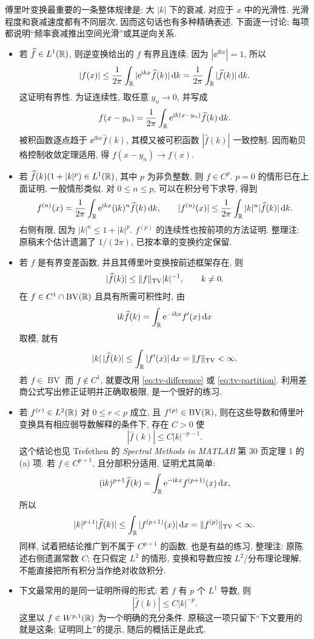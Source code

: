 傅里叶变换最重要的一条整体规律是: 大 $|k|$ 下的衰减, 对应于 $x$ 中的光滑性. 光滑程度和衰减速度都有不同层次, 因而这句话也有多种精确表述. 下面逐一讨论; 每项都说明“频率衰减推出空间光滑”或其逆向关系.
\begin{itemize}
\item 若 $\widehat f\in L^1(\mathbb R)$, 则逆变换给出的 $f$ 有界且连续. 因为 $|\ee^{\ii kx}|=1$, 所以
\[
|f(x)|\le\frac1{2\pi}\int_{\mathbb R}|\mathrm e^{\mathrm i kx}\widehat f(k)|\,\mathrm d k
=\frac1{2\pi}\int_{\mathbb R}|\widehat f(k)|\,\mathrm d k.
\]
这证明有界性. 为证连续性, 取任意 $y_n\to0$, 并写成
\[
f(x-y_n)=\frac1{2\pi}\int_{\mathbb R}\mathrm e^{\mathrm i k(x-y_n)}\widehat f(k)\,\mathrm d k.
\]
被积函数逐点趋于 $\ee^{\ii kx}\widehat f(k)$, 其模又被可积函数 $|\widehat f(k)|$ 一致控制. 因而勒贝格控制收敛定理适用, 得 $f(x-y_n)\to f(x)$.

\item 若 $\widehat f(k)(1+|k|^p)\in L^1(\mathbb R)$, 其中 $p$ 为非负整数, 则 $f\in C^p$. $p=0$ 的情形已在上面证明, 一般情形类似. 对 $0\le n\le p$, 可以在积分号下求导, 得到
\[
f^{(n)}(x)=\frac1{2\pi}\int_{\mathbb R}\mathrm e^{\mathrm i kx}(\mathrm i k)^n\widehat f(k)\,\mathrm d k,
\qquad
|f^{(n)}(x)|\le\frac1{2\pi}\int_{\mathbb R}|k|^n|\widehat f(k)|\,\mathrm d k.
\]
右侧有限, 因为 $|k|^n\le1+|k|^p$. $f^{(p)}$ 的连续性也按前项的方法证明. 整理注: 原稿末个估计遗漏了 $1/(2\pi)$, 已按本章的变换约定保留.

\item 若 $f$ 是有界变差函数, 并且其傅里叶变换按前述框架存在, 则
\[
|\widehat f(k)|\le\lVert f\rVert_{\operatorname{TV}}|k|^{-1},\qquad k\ne0.
\]
在 $f\in C^1\cap\operatorname{BV}(\mathbb R)$ 且具有所需可积性时, 由
\[
\mathrm i k\widehat f(k)=\int_{\mathbb R}\mathrm e^{-\mathrm i kx}f'(x)\,\mathrm d x
\]
取模, 就有
\[
|k|\,|\widehat f(k)|\le\int_{\mathbb R}|f'(x)|\,\mathrm d x
=\lVert f\rVert_{\operatorname{TV}}<\infty.
\]
若 $f\in\operatorname{BV}$ 而 $f\notin C^1$, 就要改用 \eqref{eq:tv-difference} 或 \eqref{eq:tv-partition}. 利用差商公式写出修正证明并正确取极限, 是一个很好的练习.

\item 若 $f^{(r)}\in L^2(\mathbb R)$ 对 $0\le r<p$ 成立, 且 $f^{(p)}\in\operatorname{BV}(\mathbb R)$, 则在这些导数和傅里叶变换具有相应弱导数解释的条件下, 存在 $C>0$ 使
\[
|\widehat f(k)|\le C|k|^{-p-1}.
\]
这个结论也见 Trefethen 的 \emph{Spectral Methods in MATLAB} 第 30 页定理 1 的 (a) 项. 若 $f\in C^{p+1}$, 且分部积分适用, 证明尤其简单:
\[
(\mathrm i k)^{p+1}\widehat f(k)=\int_{\mathbb R}\mathrm e^{-\mathrm i kx}f^{(p+1)}(x)\,\mathrm d x,
\]
所以
\[
|k|^{p+1}|\widehat f(k)|\le\int_{\mathbb R}|f^{(p+1)}(x)|\,\mathrm d x
=\lVert f^{(p)}\rVert_{\operatorname{TV}}<\infty.
\]
同样, 试着把结论推广到不属于 $C^{p+1}$ 的函数, 也是有益的练习. 整理注: 原陈述右侧遗漏常数 $C$; 在只假定 $L^2$ 的情形, 变换和导数应按 $L^2$/分布理论理解, 不能直接把所有积分当作绝对收敛积分.

\item 下文最常用的是同一证明所得的形式: 若 $f$ 有 $p$ 个 $L^1$ 导数, 则
\[
|\widehat f(k)|\le C|k|^{-p}.
\]
这里以 $f\in W^{p,1}(\mathbb R)$ 为一个明确的充分条件. 原稿这一项只留下“下文要用的就是这条; 证明同上”的提示, 随后的概括正是此式.
\end{itemize}

